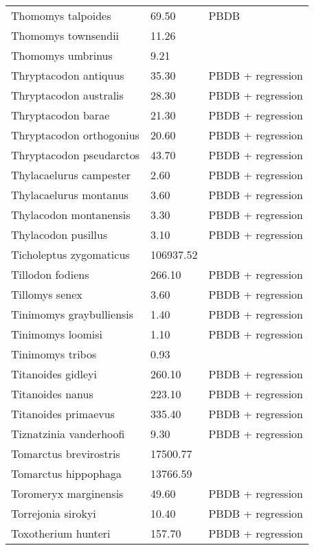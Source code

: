\begin{longtable}{p{} p{} p{}}
    Thomomys talpoides & 69.50 & PBDB \\ 
    Thomomys townsendii & 11.26 & \cite{Smith2004} \\ 
    Thomomys umbrinus & 9.21 & \cite{Smith2004} \\ 
    Thryptacodon antiquus & 35.30 & PBDB + regression \\ 
    Thryptacodon australis & 28.30 & PBDB + regression \\ 
    Thryptacodon barae & 21.30 & PBDB + regression \\ 
    Thryptacodon orthogonius & 20.60 & PBDB + regression \\ 
    Thryptacodon pseudarctos & 43.70 & PBDB + regression \\ 
    Thylacaelurus campester & 2.60 & PBDB + regression \\ 
    Thylacaelurus montanus & 3.60 & PBDB + regression \\ 
    Thylacodon montanensis & 3.30 & PBDB + regression \\ 
    Thylacodon pusillus & 3.10 & PBDB + regression \\ 
    Ticholeptus zygomaticus & 106937.52 & \cite{Tomiya2013} \\ 
    Tillodon fodiens & 266.10 & PBDB + regression \\ 
    Tillomys senex & 3.60 & PBDB + regression \\ 
    Tinimomys graybulliensis & 1.40 & PBDB + regression \\ 
    Tinimomys loomisi & 1.10 & PBDB + regression \\ 
    Tinimomys tribos & 0.93 & \cite{Skinner1972} \\ 
    Titanoides gidleyi & 260.10 & PBDB + regression \\ 
    Titanoides nanus & 223.10 & PBDB + regression \\ 
    Titanoides primaevus & 335.40 & PBDB + regression \\ 
    Tiznatzinia vanderhoofi & 9.30 & PBDB + regression \\ 
    Tomarctus brevirostris & 17500.77 & \cite{Tomiya2013} \\ 
    Tomarctus hippophaga & 13766.59 & \cite{Tomiya2013} \\ 
    Toromeryx marginensis & 49.60 & PBDB + regression \\ 
    Torrejonia sirokyi & 10.40 & PBDB + regression \\ 
    Toxotherium hunteri & 157.70 & PBDB + regression \\ 

\end{longtable}
